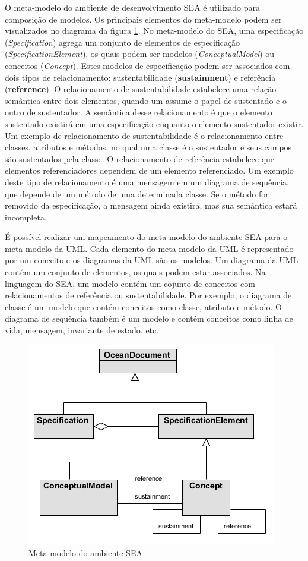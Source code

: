 O meta-modelo do ambiente de desenvolvimento SEA \cite{silva:00} é utilizado para composição de modelos. Os principais elementos do meta-modelo podem ser
visualizados no diagrama da figura \ref{fig:sea_meta_model}. No meta-modelo do SEA, uma especificação (\textit{Specification}) agrega um conjunto de elementos de
especificação (\textit{SpecificationElement}), os quais podem ser modelos (\textit{ConceptualModel}) ou conceitos (\textit{Concept}). Estes modelos
de especificação podem ser associados com dois tipos de relacionamento: sustentabilidade (\textbf{sustainment}) e referência (\textbf{reference}). O
relacionamento de sustentabilidade estabelece uma relação semântica entre dois elementos, quando um assume o papel de sustentado e o outro de
sustentador. A semântica desse relacionamento é que o elemento sustentado existirá em uma especificação enquanto o elemento sustentador existir.
Um exemplo de relacionamento de sustentabilidade é o relacionamento entre classes, atributos e métodos, no qual uma classe é o sustentador e seus
campos são sustentados pela classe. O relacionamento de referência estabelece que elementos referenciadores dependem de um elemento referenciado. Um
exemplo deste tipo de relacionamento é uma mensagem em um diagrama de sequência, que depende de um método de uma determinada classe. Se o método for
removido da especificação, a mensagem ainda existirá, mas sua semântica estará incompleta.

É possível realizar um mapeamento do meta-modelo do ambiente SEA para o meta-modelo da UML. Cada elemento do meta-modelo da UML é representado por um
conceito e os diagramas da UML são os modelos. Um diagrama da UML contém um conjunto de elementos, os quais podem estar associados. Na linguagem do
SEA, um modelo contém um cojunto de conceitos com relacionamentos de referência ou sustentabilidade. Por exemplo, o diagrama de classe é um modelo que
contém conceitos como classe, atributo e método. O diagrama de sequência também é um modelo e contém conceitos como linha de vida, mensagem,
invariante de estado, etc.

  \begin{figure}[!h]
	\centering
	\includegraphics{img/sea_meta_model.png}
	\caption{Meta-modelo do ambiente SEA \cite{silva:00}}\label{fig:sea_meta_model}
  \end{figure}
  
